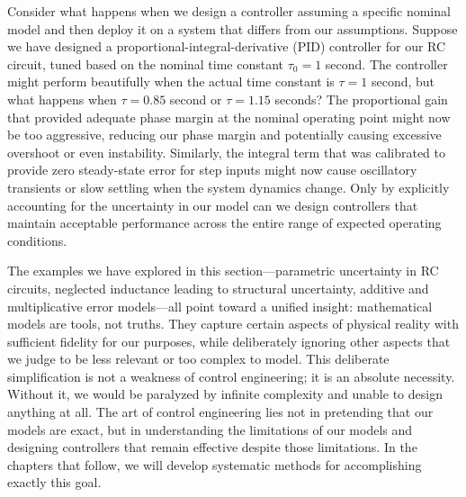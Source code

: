 Consider what happens when we design a controller assuming a specific nominal model and then deploy it on a system that differs from our assumptions. Suppose we have designed a proportional-integral-derivative (PID) controller for our RC circuit, tuned based on the nominal time constant $\tau_0 = 1$ second. The controller might perform beautifully when the actual time constant is $\tau = 1$ second, but what happens when $\tau = 0.85$ second or $\tau = 1.15$ seconds? The proportional gain that provided adequate phase margin at the nominal operating point might now be too aggressive, reducing our phase margin and potentially causing excessive overshoot or even instability. Similarly, the integral term that was calibrated to provide zero steady-state error for step inputs might now cause oscillatory transients or slow settling when the system dynamics change. Only by explicitly accounting for the uncertainty in our model can we design controllers that maintain acceptable performance across the entire range of expected operating conditions.

The examples we have explored in this section—parametric uncertainty in RC circuits, neglected inductance leading to structural uncertainty, additive and multiplicative error models—all point toward a unified insight: mathematical models are tools, not truths. They capture certain aspects of physical reality with sufficient fidelity for our purposes, while deliberately ignoring other aspects that we judge to be less relevant or too complex to model. This deliberate simplification is not a weakness of control engineering; it is an absolute necessity. Without it, we would be paralyzed by infinite complexity and unable to design anything at all. The art of control engineering lies not in pretending that our models are exact, but in understanding the limitations of our models and designing controllers that remain effective despite those limitations. In the chapters that follow, we will develop systematic methods for accomplishing exactly this goal.